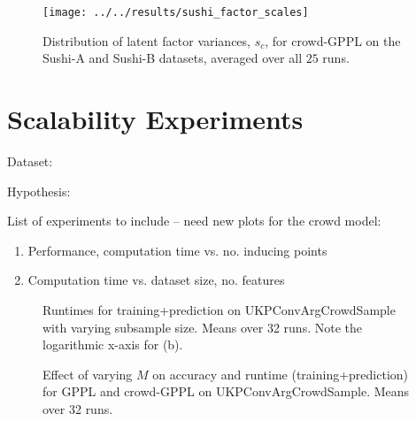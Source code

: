 \begin{figure}
\texttt{[image: ../../results/sushi\_factor\_scales]}
\caption{
Distribution of latent factor variances, $s_c$, for crowd-GPPL on the Sushi-A and Sushi-B datasets, averaged over all $25$ runs.
}
\end{figure}

\section{Scalability Experiments}\label{sec:exp_scale}

Dataset:

Hypothesis: 

List of experiments to include -- need new plots for the crowd model:
\begin{enumerate}
\item Performance, computation time vs. no. inducing points
\item Computation time vs. dataset size, no. features
\end{enumerate}

\begin{figure}
\caption{
    Runtimes for training+prediction on UKPConvArgCrowdSample with varying subsample size. Means over 32 runs. 
    Note the logarithmic x-axis for (b).
}
\end{figure}
\begin{figure}
\caption{
Effect of varying $M$ on accuracy and runtime (training+prediction) for GPPL and crowd-GPPL on UKPConvArgCrowdSample. Means over 32 runs.
}
\end{figure}

